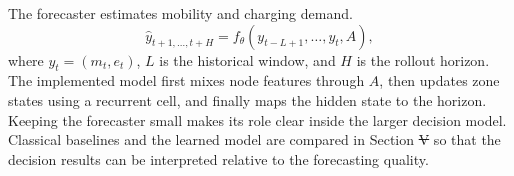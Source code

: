 \documentclass[journal]{IEEEtran}
\makeatletter
\providecommand{\DIFadd}[1]{{\protect\color{blue}\uwave{#1}}} %
\providecommand{\DIFdel}[1]{{\protect\color{red}\sout{#1}}} %
\providecommand{\DIFaddbegin}{} %
\providecommand{\DIFaddend}{} %
\providecommand{\DIFdelbegin}{} %
\providecommand{\DIFdelend}{} %
\newcommand{\DIFscaledelfig}{0.5}
\newlength{\DIFdelgraphicswidth} %
\newlength{\DIFdelgraphicsheight} %
\newcommand{\DIFaddincludegraphics}[2][]{{\color{blue}\fbox{\DIFOincludegraphics[#1]{#2}}}} %
\newcommand{\DIFdelincludegraphics}[2][]{%
\sbox{\DIFdelgraphicsbox}{\DIFOincludegraphics[#1]{#2}}%
\settoboxwidth{\DIFdelgraphicswidth}{\DIFdelgraphicsbox} %
\settoboxtotalheight{\DIFdelgraphicsheight}{\DIFdelgraphicsbox} %
\scalebox{\DIFscaledelfig}{%
\parbox[b]{\DIFdelgraphicswidth}{\usebox{\DIFdelgraphicsbox}\\[-\baselineskip] \rule{\DIFdelgraphicswidth}{0em}}\llap{\resizebox{\DIFdelgraphicswidth}{\DIFdelgraphicsheight}{%
\setlength{\unitlength}{\DIFdelgraphicswidth}%
\begin{picture}(1,1)%
\thicklines\linethickness{2pt} %
{\color[rgb]{1,0,0}\put(0,0){\framebox(1,1){}}}%
{\color[rgb]{1,0,0}\put(0,0){\line( 1,1){1}}}%
{\color[rgb]{1,0,0}\put(0,1){\line(1,-1){1}}}%
\end{picture}%
}\hspace*{3pt}}} %
} %
\DeclareRobustCommand{\DIFaddbegin}{\DIFOaddbegin \let\includegraphics\DIFaddincludegraphics} %
\DeclareRobustCommand{\DIFaddend}{\DIFOaddend \let\includegraphics\DIFOincludegraphics} %
\DeclareRobustCommand{\DIFdelbegin}{\DIFOdelbegin \let\includegraphics\DIFdelincludegraphics} %
\DeclareRobustCommand{\DIFdelend}{\DIFOaddend \let\includegraphics\DIFOincludegraphics} %
\let\sout@orig\sout %
\renewcommand{\sout}[1]{\ifmmode\text{\sout@orig{\ensuremath{#1}}}\else\sout@orig{#1}\fi} %
\makeatother
\begin{document}
The forecaster estimates mobility and charging demand.
\DIFdelbegin %
\DIFdelend \DIFaddbegin \begin{equation}
\hat y_{t+1,\ldots,t+H}=f_{\theta}(y_{t-L+1},\ldots,y_t,A),
\end{equation}\DIFaddend 
where $y_t=(m_t,e_t)$, $L$ is the historical window, and $H$ is the rollout
horizon.  The implemented model first mixes node features through $A$, then
updates zone states using a recurrent cell, and finally maps the hidden state to
the horizon.  Keeping the forecaster small makes its role clear inside the
larger decision model.  Classical baselines and the learned model are compared
in Section \DIFdelbegin \DIFdel{V }\DIFdelend \DIFaddbegin \DIFadd{IV }\DIFaddend so that the decision results can be interpreted relative to the
forecasting quality.
\end{document}
